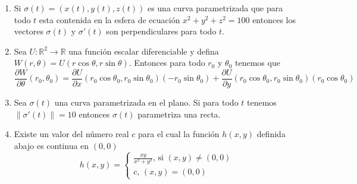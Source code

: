 \documentclass[12pt]{article}
\newcommand{\RR}{\mathbb{R}}
\begin{document}
\begin{enumerate}
\begin{enumerate}

\item Si $\sigma(t)=(x(t),y(t),z(t))$ es una curva parametrizada que para todo $t$ esta contenida en la esfera de ecuaci\'on $x^2+y^2+z^2=100$ entonces los vectores $\sigma(t)$ y $\sigma'(t)$ son perpendiculares para todo $t$.


\item Sea $U:\RR^2\rightarrow \RR$ una funci\'on escalar diferenciable y defina $W(r,\theta)=U(r\cos\theta, r\sin\theta)$. Entonces para todo $r_0$ y $\theta_0$ tenemos que
\[\frac{\partial W}{\partial \theta}(r_0,\theta_0) = \frac{\partial U}{\partial x}(r_0\cos\theta_0, r_0\sin\theta_0)\left(-r_0\sin\theta_0\right)+ \frac{\partial U}{\partial y}(r_0\cos\theta_0, r_0\sin\theta_0)\left(r_0\cos\theta_0\right)\]

\item Sea $\sigma(t)$ una curva parametrizada en el plano. Si para todo $t$ tenemos $\|\sigma'(t)\|=10$ entonces $\sigma(t)$ parametriza una recta.

\item Existe un valor del n\'umero real $c$ para el cual la funci\'on $h(x,y)$ definida abajo es continua en $(0,0)$ 
\[ h(x,y)=\begin{cases}
\frac{xy}{x^2+y^2}\text{, si $(x,y)\neq (0,0)$}\\
c\text{, $(x,y) = (0,0)$}
\end{cases}\]

\end{enumerate}
\end{enumerate}
 
\end{document}
